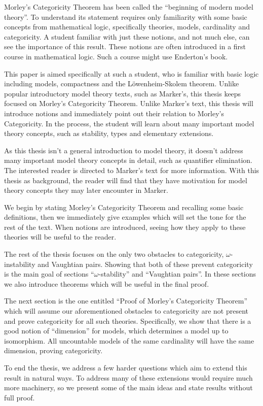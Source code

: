 Morley's Categoricity Theorem has been called the ``beginning of modern model theory''.
To understand its statement requires only familiarity with some basic concepts from mathematical logic, specifically theories, models, cardinality and categoricity. 
A student familiar with just these notions, and not much else, can see the importance of this result.
These notions are often introduced in a first course in mathematical logic.
Such a course might use Enderton's book. %

This paper is aimed specifically at such a student, who is familiar with basic logic including models, compactness and the L\"owenheim-Skolem theorem.
Unlike popular introductory model theory texts, such as Marker's, %
this thesis keeps focused on Morley's Categoricity Theorem.
Unlike Marker's text, this thesis will introduce notions and immediately point out their relation to Morley's Categoricity. 
In the process, the student will learn about many important model theory concepts, such as stability, types and elementary extensions. 

As this thesis isn't a general introduction to model theory, it doesn't address many important model theory concepts in detail, such as quantifier elimination.
The interested reader is directed to Marker's text for more information. 
With this thesis as background, the reader will find that they have motivation for model theory concepts they may later encounter in Marker.

We begin by stating Morley's Categoricity Theorem and recalling some basic definitions, then we immediately give examples which will set the tone for the rest of the text. 
When notions are introduced, seeing how they apply to these theories will be useful to the reader. 

The rest of the thesis focuses on the only two obstacles to categoricity, \(\omega\)-instability and Vaughtian pairs. 
Showing that both of these prevent categoricity is the main goal of sections ``\(\omega\)-stability'' and ``Vaughtian pairs''. 
In these sections we also introduce theorems which will be useful in the final proof. 

The next section is the one entitled ``Proof of Morley's Categoricity Theorem'' which will assume our aforementioned obstacles to categoricity are not present and prove categoricity for all such theories. 
Specifically, we show that there is a good notion of ``dimension'' for models, which determines a model up to isomorphism. 
All uncountable models of the same cardinality will have the same dimension, proving categoricity. 

To end the thesis, we address a few harder questions which aim to extend this result in natural ways. 
To address many of these extensions would require much more machinery, so we present some of the main ideas and state results without full proof. 
